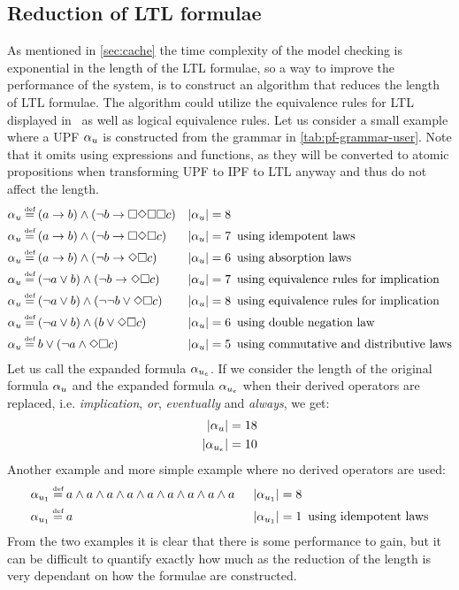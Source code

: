 \subsection{Reduction of LTL formulae}\label{sec:min-ltl}
As mentioned in \autoref{sec:cache} the time complexity of the model checking is exponential in the length of the LTL formulae, so a way to improve the performance of the system, is to construct an algorithm that reduces the length of LTL formulae. The algorithm could utilize the equivalence rules for LTL displayed in~\cite[Fig.~5.7]{baier2008principles} as well as logical equivalence rules. Let us consider a small example where a UPF $\alpha_u$ is constructed from the grammar in \autoref{tab:pf-grammar-user}. Note that it omits using expressions and functions, as they will be converted to atomic propositions when transforming UPF to IPF to LTL anyway and thus do not affect the length.
\begin{align*}
    \pf_u &\eqdef (a \imply b) \land (\lnot b \imply \G\F\G\G c)     &|\upf| = 8 & \\
    \pf_u &\eqdef (a \imply b) \land (\lnot b \imply \G\F\G c)       &|\upf| = 7 &\enskip \text{using idempotent laws} \\
    \pf_u &\eqdef (a \imply b) \land (\lnot b \imply \F\G c)         &|\upf| = 6 &\enskip \text{using absorption laws} \\
    \pf_u &\eqdef (\lnot a \lor b) \land (\lnot b \imply \F\G c)     &|\upf| = 7 &\enskip \text{using equivalence rules for implication} \\
    \pf_u &\eqdef (\lnot a \lor b) \land (\lnot \lnot b \lor \F\G c) &|\upf| = 8 &\enskip \text{using equivalence rules for implication} \\
    \pf_u &\eqdef (\lnot a \lor b) \land (b \lor \F\G c)             &|\upf| = 6 &\enskip \text{using double negation law} \\
    \pf_u &\eqdef b \lor (\lnot a \land \F\G c)                      &|\upf| = 5 &\enskip \text{using commutative and distributive laws}
\end{align*}
Let us call the expanded formula $\alpha_{u_e}$. If we consider the length of the original formula $\alpha_u$ and the expanded formula $\alpha_{u_e}$ when their derived operators are replaced, i.e. \emph{implication}, \emph{or}, \emph{eventually} and \emph{always}, we get:
\begin{align}
    |\alpha_u| = 18 \\
    |\alpha_{u_e}| = 10
\end{align}
Another example and more simple example where no derived operators are used:
\begin{align*}
    \pf_{u_1} &\eqdef a \land a \land a \land a \land a \land a \land a \land a \land a \enskip &|\pf_{u_1}| = 8 & \\
    \pf_{u_1} &\eqdef a                                                                 \enskip &|\pf_{u_1}| = 1 &\enskip \text{using idempotent laws}
\end{align*}
From the two examples it is clear that there is some performance to gain, but it can be difficult to quantify exactly how much as the reduction of the length is very dependant on how the formulae are constructed.

